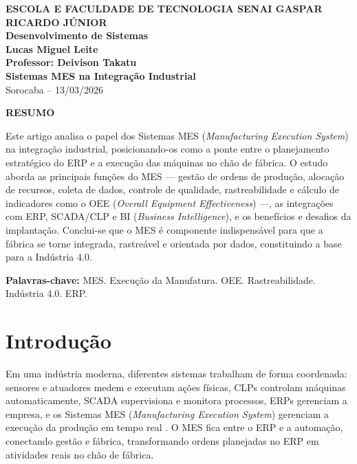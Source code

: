 \documentclass[12pt,a4paper,oneside]{article}
\begin{document}
\begin{center}
  \textbf{\large ESCOLA E FACULDADE DE TECNOLOGIA SENAI GASPAR RICARDO JÚNIOR}\\
  \textbf{Desenvolvimento de Sistemas}\\[1cm]
  \textbf{\Large Lucas Miguel Leite}\\[0.5cm]
  \textbf{Professor: Deivison Takatu}\\[2cm]
  \textbf{\LARGE\textbf{Sistemas MES na Integração Industrial}}\\[1cm]
  Sorocaba -- 13/03/2026
\end{center}

\vspace{1cm}

\begin{center}
  \textbf{RESUMO}
\end{center}

Este artigo analisa o papel dos Sistemas MES (\textit{Manufacturing Execution System}) na integração industrial, posicionando-os como a ponte entre o planejamento estratégico do ERP e a execução das máquinas no chão de fábrica. O estudo aborda as principais funções do MES --- gestão de ordens de produção, alocação de recursos, coleta de dados, controle de qualidade, rastreabilidade e cálculo de indicadores como o OEE (\textit{Overall Equipment Effectiveness}) ---, as integrações com ERP, SCADA/CLP e BI (\textit{Business Intelligence}), e os benefícios e desafios da implantação. Conclui-se que o MES é componente indispensável para que a fábrica se torne integrada, rastreável e orientada por dados, constituindo a base para a Indústria 4.0.

\vspace{0.5cm}
\textbf{Palavras-chave:} MES. Execução da Manufatura. OEE. Rastreabilidade. Indústria 4.0. ERP.

\newpage

\section{Introdução}

Em uma indústria moderna, diferentes sistemas trabalham de forma coordenada: sensores e atuadores medem e executam ações físicas, CLPs controlam máquinas automaticamente, SCADA supervisiona e monitora processos, ERPs gerenciam a empresa, e os Sistemas MES (\textit{Manufacturing Execution System}) gerenciam a execução da produção em tempo real \cite{groover2011}. O MES fica entre o ERP e a automação, conectando gestão e fábrica, transformando ordens planejadas no ERP em atividades reais no chão de fábrica.
\end{document}

